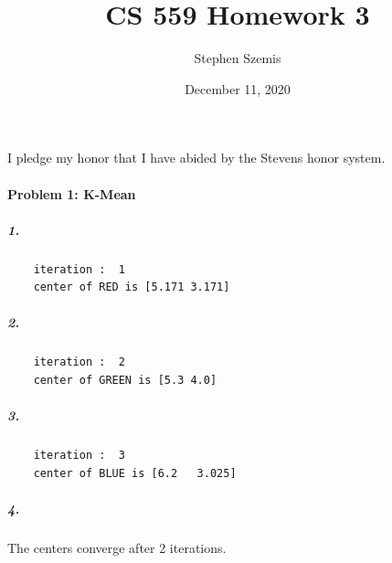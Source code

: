 \documentclass[12pt]{article}
\begin{document}
    \title{CS 559 Homework 3}
    \author{Stephen Szemis}
    \date{December 11, 2020}
    \maketitle

    I pledge my honor that I have abided by the Stevens honor system.

    \paragraph{Problem 1: K-Mean}
    \subparagraph{1.}
    \begin{verbatim}
    iteration :  1
    center of RED is [5.171 3.171]
    \end{verbatim}
    \subparagraph{2.}
    \begin{verbatim}
    iteration :  2
    center of GREEN is [5.3 4.0]
    \end{verbatim}
    \subparagraph{3.}
    \begin{verbatim}
    iteration :  3
    center of BLUE is [6.2   3.025]
    \end{verbatim}
    \subparagraph{4.}
    The centers converge after 2 iterations.
    
\end{document}
